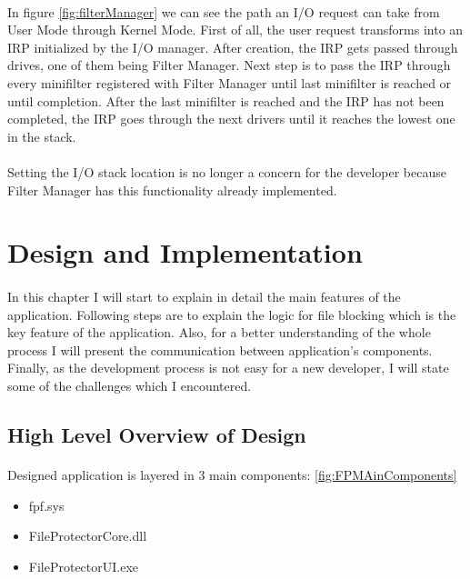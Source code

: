 		
		\paragraph{}
		In figure \ref{fig:filterManager} we can see the path an I/O request can take from User Mode through Kernel Mode. First of all, the user request transforms into an IRP initialized by the I/O manager. After creation, the IRP gets passed through drives, one of them being Filter Manager. Next step is to pass the IRP through every minifilter registered with Filter Manager until  last minifilter is reached or until completion. After the last minifilter is reached and the IRP has not been completed, the IRP goes through the next drivers until it reaches the lowest one in the stack.
		
		\paragraph{}
		Setting the I/O stack location is no longer a concern for the developer because Filter Manager has this functionality already implemented.
			
	\newpage		
	\section{Design and Implementation}
		\paragraph{}
		In this chapter I will start to explain in detail the main features of the application. Following steps are to explain the logic for file blocking which is the key feature of the application. Also, for a better understanding of the whole process I will present the communication between application's components. Finally, as the development process is not easy for a new developer, I will state some of the challenges which I encountered.
	
		\subsection{High Level Overview of Design}
		\paragraph{}
		Designed application is layered in 3 main components: \ref{fig:FPMAinComponents}
		\begin{itemize}
			\item fpf.sys
			\item FileProtectorCore.dll
			\item FileProtectorUI.exe
		\end{itemize}
		
